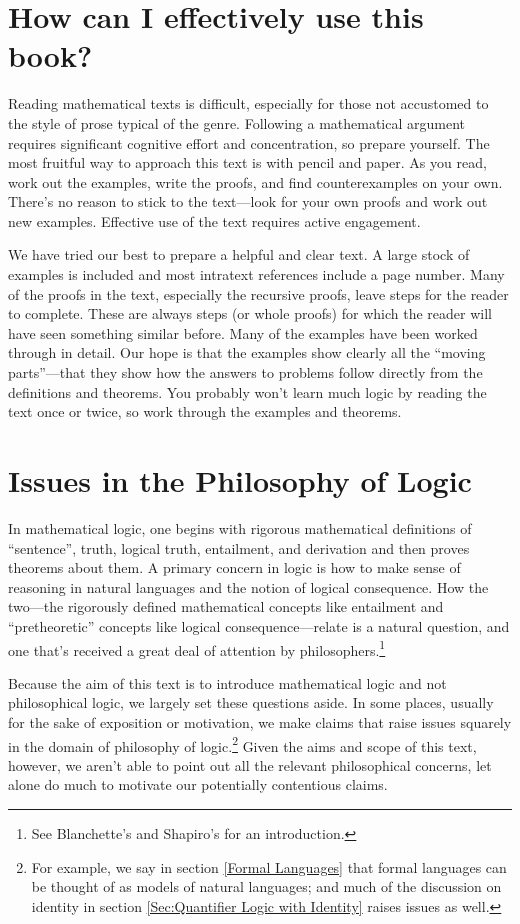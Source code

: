 \documentclass[11pt,fleqn,twoside,openright]{report}%
\begin{document}
\section*{How can I effectively use this book?}

Reading mathematical texts is difficult, especially for those not accustomed to the style of prose typical of the genre.
Following a mathematical argument requires significant cognitive effort and concentration, so prepare yourself.
The most fruitful way to approach this text is with pencil and paper. 
As you read, work out the examples, write the proofs, and find counterexamples on your own.
There's no reason to stick to the text---look for your own proofs and work out new examples. 
Effective use of the text requires active engagement. 

We have tried our best to prepare a helpful and clear text.
A large stock of examples is included and most intratext references include a page number.
Many of the proofs in the text, especially the recursive proofs, leave steps for the reader to complete.
These are always steps (or whole proofs) for which the reader will have seen something similar before.  
Many of the examples have been worked through in detail.
Our hope is that the examples show clearly all the ``moving parts''---that they show how the answers to problems follow directly from the definitions and theorems. 
You probably won't learn much logic by reading the text once or twice, so work through the examples and theorems. 

\section*{Issues in the Philosophy of Logic}\label{issuesinphillogic}
 
In mathematical logic, one begins with rigorous mathematical definitions of ``sentence'', truth, logical truth, entailment, and derivation and then proves theorems about them.
A primary concern in logic is how to make sense of reasoning in natural languages and the notion of logical consequence. 
How the two---the rigorously defined mathematical concepts like entailment and ``pretheoretic'' concepts like logical consequence---relate is a natural question, and one that's received a great deal of attention by philosophers.\footnote{See Blanchette's \citeyearpar{Blanchette2001} and Shapiro's \citeyearpar{Shapiro2005c} for an introduction.}

Because the aim of this text is to introduce mathematical logic and not philosophical logic, we largely set these questions aside. 
In some places, usually for the sake of exposition or motivation, we make claims that raise issues squarely in the domain of philosophy of logic.\footnote{For example, we say in section \ref{Formal Languages} that formal languages can be thought of as models of natural languages; and much of the discussion on identity in section \ref{Sec:Quantifier Logic with Identity} raises issues as well.} 
Given the aims and scope of this text, however, we aren't able to point out all the relevant philosophical concerns, let alone do much to motivate our potentially contentious claims.
\end{document}
